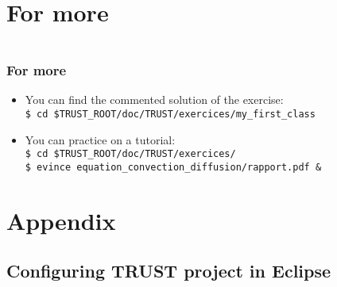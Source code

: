 \documentclass[10pt, hyperref={unicode=true,pdfusetitle, bookmarks=true,bookmarksnumbered=false,bookmarksopen=false, breaklinks=false,pdfborder={0 0 1},backref=true,colorlinks=true,linkcolor=darkblue,pageanchor, urlcolor=darkblue}]{beamer}
\begin{document}
\section{{\bf{For more}}}
\begin{frame}
\begin{columns}[c] 
\tableofcontents[sections={1-4},currentsection, currentsubsection]
\tableofcontents[sections={5-10},currentsection, currentsubsection]
\end{columns}
\end{frame}
\begin{frame}
\frametitle{For more}
\begin{block}{}

\begin{itemize}
\item You can find the commented solution of the exercise:\\
\texttt{\$ cd \$TRUST\_ROOT/doc/TRUST/exercices/my\_first\_class}

\item You can practice on a tutorial:\\
\texttt{\$ cd \$TRUST\_ROOT/doc/TRUST/exercices/}\\
\texttt{\$ evince equation\_convection\_diffusion/rapport.pdf \&}
\end{itemize}

\end{block}
\end{frame}

\section{\bf{Appendix}}

\subsection{\bf{Configuring TRUST project in Eclipse}}
\end{document}
